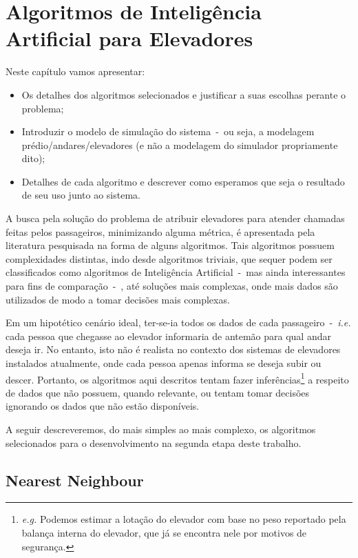 \chapter{\label{chap:ai}Algoritmos de Inteligência Artificial para Elevadores}

Neste capítulo vamos apresentar:

\begin{itemize}
\item Os detalhes dos algoritmos selecionados e justificar a suas escolhas perante o problema;
\item Introduzir o modelo de simulação do sistema~-~ou seja, a modelagem
prédio/andares/elevadores (e não a modelagem do simulador propriamente dito);
\item Detalhes de cada algoritmo e descrever como esperamos que seja o resultado de seu uso junto ao sistema.
\end{itemize}

A busca pela solução do problema de atribuir elevadores para atender chamadas
feitas pelos passageiros, minimizando alguma métrica, é apresentada pela
literatura pesquisada na forma de alguns algoritmos. Tais algoritmos possuem
complexidades distintas, indo desde algoritmos triviais, que sequer podem ser
classificados como algoritmos de Inteligência Artificial~-~mas ainda
interessantes para fins de comparação~-~, até soluções mais complexas, onde mais
dados são utilizados de modo a tomar decisões mais complexas.

Em um hipotético cenário ideal, ter-se-ia todos os dados de cada passageiro~-~\textit{i.e.} cada
pessoa que chegasse ao elevador informaria de antemão para qual andar deseja ir.
No entanto, isto não é realista no contexto dos sistemas de elevadores
instalados atualmente, onde cada pessoa apenas informa se deseja subir ou descer. Portanto, os algoritmos
aqui descritos tentam fazer inferências\footnote{\textit{e.g.} Podemos estimar a
lotação do elevador com base no peso reportado pela balança interna do elevador, que já se
  encontra nele por motivos de segurança.} a respeito de dados que não possuem,
quando relevante, ou tentam tomar decisões ignorando os dados que não estão disponíveis.

A seguir descreveremos, do mais simples ao mais complexo, os algoritmos
selecionados para o desenvolvimento na segunda etapa deste trabalho.

\section{\label{sec:ai:nn}Nearest Neighbour}

